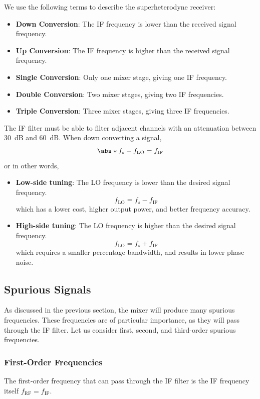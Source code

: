 \documentclass{article}
\begin{document}
We use the following terms to describe the superheterodyne receiver:
\begin{itemize}
    \item \textbf{Down Conversion}: The IF frequency is lower than the received signal frequency.
    \item \textbf{Up Conversion}: The IF frequency is higher than the received signal frequency.
    \item \textbf{Single Conversion}: Only one mixer stage, giving one IF frequency.
    \item \textbf{Double Conversion}: Two mixer stages, giving two IF frequencies.
    \item \textbf{Triple Conversion}: Three mixer stages, giving three IF frequencies.
\end{itemize}
The IF filter must be able to filter adjacent channels with an
attenuation between \qty{30}{dB} and \qty{60}{dB}.
When down converting a signal,
\begin{equation*}
    \abs*{f_s - f_{\mathrm{LO}}} = f_{\mathrm{IF}}
\end{equation*}
or in other words,
\begin{itemize}
    \item \textbf{Low-side tuning}: The LO frequency is lower than the desired signal frequency.
          \begin{equation*}
              f_{\mathrm{LO}} = f_s - f_{\mathrm{IF}}
          \end{equation*}
          which has a lower cost, higher output power, and better frequency accuracy.
    \item  \textbf{High-side tuning}: The LO frequency is higher than the desired signal frequency.
          \begin{equation*}
              f_{\mathrm{LO}} = f_s + f_{\mathrm{IF}}
          \end{equation*}
          which requires a smaller percentage bandwidth, and results in lower phase noise.
\end{itemize}
\subsection{Spurious Signals}
As discussed in the previous section, the mixer will produce many
spurious frequencies. These frequencies are of particular importance,
as they will pass through the IF filter. Let us consider first, second,
and third-order spurious frequencies.
\subsubsection{First-Order Frequencies}
The first-order frequency that can pass through the IF filter is the IF
frequency itself \(f_{\mathrm{RF}} = f_{\mathrm{IF}}\).
\end{document}

